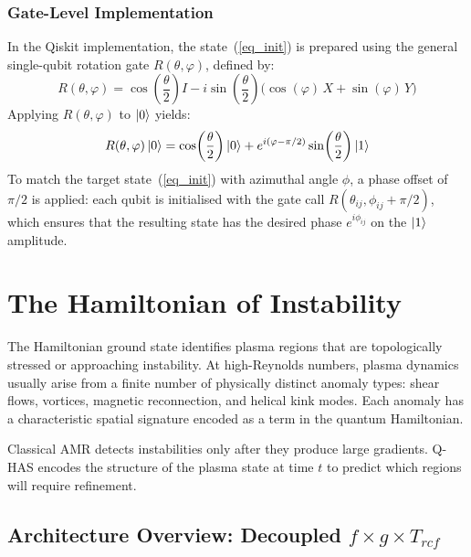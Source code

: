 \documentclass[12pt, a4paper, oneside]{report}
\begin{document}
\subsection{Gate-Level Implementation}
\label{sec:gate-level}

In the Qiskit implementation, the state~(\ref{eq_init}) is prepared using the general single-qubit rotation gate $R(\theta, \varphi)$, defined by:
\begin{equation}
    R(\theta, \varphi) = \cos\!\left(\frac{\theta}{2}\right) I - i \sin\!\left(\frac{\theta}{2}\right) \bigl(\cos(\varphi)\, X + \sin(\varphi)\, Y\bigr)
\end{equation}
Applying $R(\theta, \varphi)$ to $\ket{0}$ yields:
\begin{equation}
    R(\theta, \varphi)\ket{0} = \cos\!\left(\frac{\theta}{2}\right)\ket{0} + e^{i(\varphi - \pi/2)} \sin\!\left(\frac{\theta}{2}\right)\ket{1}
\end{equation}
To match the target state~(\ref{eq_init}) with azimuthal angle $\phi$, a phase offset of $\pi/2$ is applied: each qubit is initialised with the gate call $R(\theta_{ij}, \phi_{ij} + \pi/2)$, which ensures that the resulting state has the desired phase $e^{i\phi_{ij}}$ on the $\ket{1}$ amplitude.


\chapter{The Hamiltonian of Instability}
\label{chap:hamiltonian}

The Hamiltonian ground state identifies plasma regions that are topologically stressed or approaching instability. At high-Reynolds numbers, plasma dynamics usually arise from a finite number of physically distinct anomaly types: shear flows, vortices, magnetic reconnection, and helical kink modes. Each anomaly has a characteristic spatial signature encoded as a term in the quantum Hamiltonian.

Classical AMR detects instabilities only after they produce large gradients. Q-HAS encodes the structure of the plasma state at time $t$ to predict which regions will require refinement.

\section{Architecture Overview: Decoupled $f \times g \times T_{rcf}$}
\label{sec:hamilt-architecture}
\end{document}
